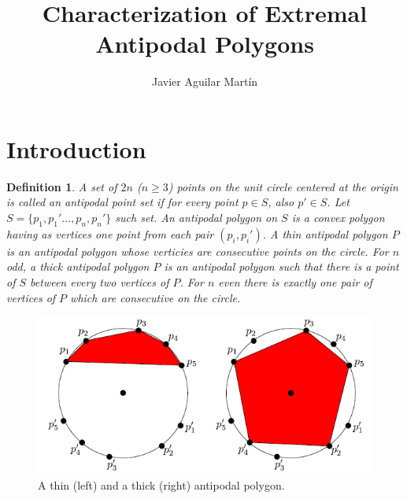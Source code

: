 \documentclass[twoside]{article}
\newtheorem{defin}{Definition}[section]
\begin{document}
\title{Characterization of Extremal Antipodal Polygons}
\author{Javier Aguilar Martín}
\maketitle

\section{Introduction}



\begin{defin}
A set of $2n$ ($n\geq 3$) points on the unit circle centered at the origin is called an \emph{antipodal point set} if for every point $p\in S$, also $p'\in S$. Let $S=\{p_1,p_1'\dots,p_n,p_n'\}$ such set. An \emph{antipodal polygon} on $S$ is a convex polygon  having as vertices one point from each pair $(p_i,p_i')$. A \emph{thin} antipodal polygon $P$ is an antipodal polygon whose verticies are consecutive points on the circle. For $n$ odd, a \emph{thick} antipodal polygon $P$ is an antipodal polygon such that there is a point of $S$ between every two vertices of $P$. For $n$ even there is exactly one pair of vertices of $P$ which are consecutive on the circle. 
\end{defin}

\begin{figure}[h!]
\centering
\includegraphics[scale=0.7]{fig1}
\caption{A thin (left) and a thick (right) antipodal polygon.}
\end{figure}
\end{document}
